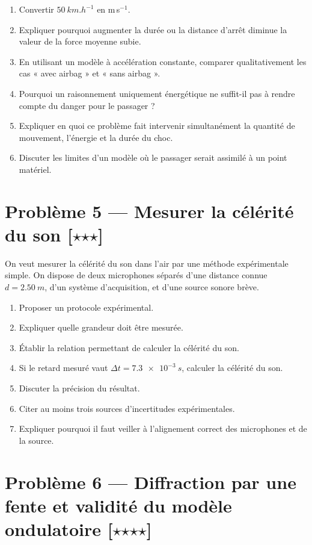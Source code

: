 \documentclass[11pt,a4paper]{article}
\newcommand{\etoile}{\ensuremath{\star}}
\begin{document}
\begin{enumerate}[label=\arabic*)]
    \item Convertir $\SI{50}{km.h^{-1}}$ en m\,s$^{-1}$.
    \item Expliquer pourquoi augmenter la durée ou la distance d'arrêt diminue la valeur de la force moyenne subie.
    \item En utilisant un modèle à accélération constante, comparer qualitativement les cas « avec airbag » et « sans airbag ».
    \item Pourquoi un raisonnement uniquement énergétique ne suffit-il pas à rendre compte du danger pour le passager ?
    \item Expliquer en quoi ce problème fait intervenir simultanément la quantité de mouvement, l'énergie et la durée du choc.
    \item Discuter les limites d'un modèle où le passager serait assimilé à un point matériel.
\end{enumerate}

\section*{Problème 5 --- Mesurer la célérité du son \hfill [\etoile\etoile\etoile]}

On veut mesurer la célérité du son dans l'air par une méthode expérimentale simple. On dispose de deux microphones séparés d'une distance connue $d=\SI{2,50}{m}$, d'un système d'acquisition, et d'une source sonore brève.

\begin{enumerate}[label=\arabic*)]
    \item Proposer un protocole expérimental.
    \item Expliquer quelle grandeur doit être mesurée.
    \item Établir la relation permettant de calculer la célérité du son.
    \item Si le retard mesuré vaut $\Delta t = \SI{7,3e-3}{s}$, calculer la célérité du son.
    \item Discuter la précision du résultat.
    \item Citer au moins trois sources d'incertitudes expérimentales.
    \item Expliquer pourquoi il faut veiller à l'alignement correct des microphones et de la source.
\end{enumerate}

\section*{Problème 6 --- Diffraction par une fente et validité du modèle ondulatoire \hfill [\etoile\etoile\etoile\etoile]}
\end{document}
